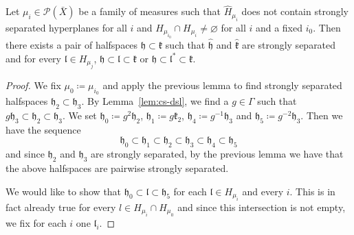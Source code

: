 \begin{lemma}[{\cite[Lemma~4.20]{MR3509968}}]
  \label{lem:4.20}
  Let \(\mu_i \in \mathcal{P}(\bar X)\) be a family of measures such that \(\hat H_{\mu_i}\) does not contain strongly separated hyperplanes for all \(i\) and \(H_{\mu_{i_0}} \cap H_{\mu_i} \neq \varnothing\) for all \(i\) and a fixed \(i_0\). Then there exists a pair of halfspaces \(\mathfrak{h} \subset \mathfrak{k}\) such that \(\mathfrak{\hat h}\) and \(\mathfrak{\hat k}\) are strongly separated and for every \(\mathfrak{l} \in H_{\mu_j}\), \(\mathfrak{h} \subset \mathfrak{l} \subset \mathfrak{k}\) or \(\mathfrak{h} \subset \mathfrak{l}^\ast \subset \mathfrak{k}\).
\end{lemma}

\begin{proof}
  We fix \(\mu_0\coloneqq \mu_{i_0}\) and apply the previous lemma to find strongly separated halfspaces \(\mathfrak{h_2} \subset \mathfrak{h_3}\). By Lemma~\ref{lem:cs-dsl}, we find a \(g \in \Gamma\) such that \(g\mathfrak{h}_3 \subset \mathfrak{h}_2 \subset \mathfrak{h}_3\). We set \(\mathfrak{h}_0 \coloneqq g^2 \mathfrak{h}_2\), \(\mathfrak{h}_1 \coloneqq g\mathfrak{k}_2\), \(\mathfrak{h}_4 \coloneqq g^{-1}\mathfrak{h}_3\) and \(\mathfrak{h}_5 \coloneqq g^{-2} \mathfrak{h}_3\). Then we have the sequence
  \[
    \mathfrak{h}_0 \subset \mathfrak{h}_1 \subset \mathfrak{h}_2 \subset \mathfrak{h}_3 \subset \mathfrak{h}_4 \subset \mathfrak{h}_5
  \]
  and since \(\mathfrak{h}_2\) and \(\mathfrak{h}_3\) are strongly separated, by the previous lemma we have that the above halfspaces are pairwise strongly separated.

  We would like to show that \(\mathfrak{h}_0 \subset \mathfrak{l} \subset \mathfrak{h}_5\) for each \(\mathfrak{l} \in H_{\mu_i}\) and every \(i\). This is in fact already true for every \(l \in H_{\mu_i} \cap H_{\mu_0}\) and since this intersection is not empty, we fix for each \(i\) one \(\mathfrak{l}_i\).


\end{proof}
